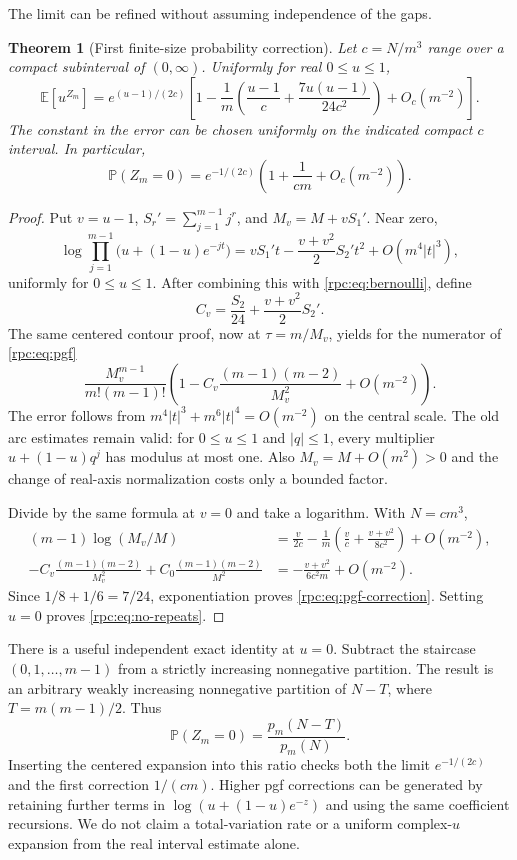 \documentclass[11pt]{article}
\newtheorem{theorem}{Theorem}[section]
\theoremstyle{definition}
\theoremstyle{remark}
\newcommand{\E}{\mathbb E}
\newcommand{\Prob}{\mathbb P}
\numberwithin{equation}{section}
\begin{document}
The limit can be refined without assuming independence of the gaps.

\begin{theorem}[First finite-size probability correction]\label{rpc:thm:pgf}
Let $c=N/m^3$ range over a compact subinterval of $(0,\infty)$. Uniformly
for real $0\le u\le1$,
\begin{equation}\label{rpc:eq:pgf-correction}
 \E[u^{Z_m}]=e^{(u-1)/(2c)}
 \left[1-\frac1m\left(\frac{u-1}{c}
             +\frac{7u(u-1)}{24c^2}\right)+O_c(m^{-2})\right].
\end{equation}
The constant in the error can be chosen uniformly on the indicated compact
$c$ interval. In particular,
\begin{equation}\label{rpc:eq:no-repeats}
 \Prob(Z_m=0)=e^{-1/(2c)}\left(1+\frac1{cm}+O_c(m^{-2})\right).
\end{equation}
\end{theorem}
\begin{proof}
Put $v=u-1$, $S_r'=\sum_{j=1}^{m-1}j^r$, and $M_v=M+vS_1'$.
Near zero,
\[
 \log\prod_{j=1}^{m-1}\bigl(u+(1-u)e^{-jt}\bigr)
 =vS_1't-\frac{v+v^2}{2}S_2't^2+O(m^4|t|^3),
\]
uniformly for $0\le u\le1$. After combining this with
\eqref{rpc:eq:bernoulli}, define
\[
 C_v=\frac{S_2}{24}+\frac{v+v^2}{2}S_2'.
\]
The same centered contour proof, now at $\tau=m/M_v$, yields for the numerator
of \eqref{rpc:eq:pgf}
\[
 \frac{M_v^{m-1}}{m!(m-1)!}
 \left(1-C_v\frac{(m-1)(m-2)}{M_v^2}+O(m^{-2})\right).
\]
The error follows from $m^4|t|^3+m^6|t|^4=O(m^{-2})$ on the central
scale. The old arc estimates remain valid: for $0\le u\le1$ and
$|q|\le1$, every multiplier $u+(1-u)q^j$ has modulus at most one.
Also $M_v=M+O(m^2)>0$ and the change of real-axis normalization costs only
a bounded factor.

Divide by the same formula at $v=0$ and take a logarithm. With $N=cm^3$,
\begin{align*}
 (m-1)\log(M_v/M)
 &=\frac v{2c}-\frac1m\left(\frac vc+\frac{v+v^2}{8c^2}\right)
         +O(m^{-2}),\\
 -C_v\frac{(m-1)(m-2)}{M_v^2}
 +C_0\frac{(m-1)(m-2)}{M^2}
 &=-\frac{v+v^2}{6c^2m}+O(m^{-2}).
\end{align*}
Since $1/8+1/6=7/24$, exponentiation proves \eqref{rpc:eq:pgf-correction}.
Setting $u=0$ proves \eqref{rpc:eq:no-repeats}.
\end{proof}

There is a useful independent exact identity at $u=0$. Subtract the staircase
$(0,1,\ldots,m-1)$ from a strictly increasing nonnegative partition. The result
is an arbitrary weakly increasing nonnegative partition of
$N-T$, where $T=m(m-1)/2$. Thus
\begin{equation}\label{rpc:eq:staircase}
 \Prob(Z_m=0)=\frac{p_m(N-T)}{p_m(N)}.
\end{equation}
Inserting the centered expansion into this ratio checks both the limit
$e^{-1/(2c)}$ and the first correction $1/(cm)$.
Higher pgf corrections can be generated by retaining further terms in
$\log(u+(1-u)e^{-z})$ and using the same coefficient recursions. We do not
claim a total-variation rate or a uniform complex-$u$ expansion from the
real interval estimate alone.
\end{document}

